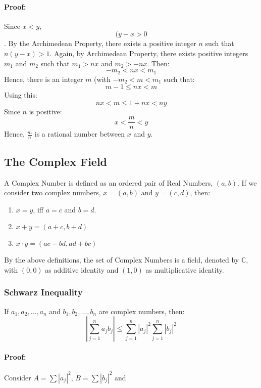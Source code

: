 \documentclass[12pt, oneside]{book}
\begin{document}
\paragraph{Proof:} Since \(x<y\), \[(y-x > 0\].
By the Archimedean Property, there exists a positive integer \(n\) such that \(n(y-x) > 1\).
Again, by Archimedean Property, there exists positive integers \(m_1\) and \(m_2\) such that \(m_1 > nx\) and \(m_2 > -nx\).
Then: \[ -m_2 < nx < m_1 \]
Hence, there is an integer \(m\) (with \( -m_2 < m < m_1 \) such that:
\[ m-1 \leq nx < m \]
Using this:
\[ nx < m \leq 1+nx <ny \]
Since \(n\) is positive:
\[ x < \frac{m}{n} < y \]
Hence, \(\frac{m}{n}\) is a rational number between \(x\) and \(y\).

\subsection{The Complex Field}
A Complex Number is defined as an ordered pair of Real Numbers, \((a,b)\).
If we consider two complex numbers, \(x=(a,b)\) and \(y=(c,d)\), then:
\begin{enumerate}
	\item \(x = y\), iff \(a=c\) and \(b=d\).
	\item \(x+y = (a+c,b+d)\)
	\item \(x \cdot y = (ac-bd,ad+bc)\)
\end{enumerate}
By the above definitions, the set of Complex Numbers is a field, denoted by \(\mathbb{C}\), with \((0,0)\) as additive identity and \((1,0)\) as multiplicative identity.

\subsubsection{Schwarz Inequality}
If \( a_1, a_2, \dots, a_n \) and \( b_1, b_2, \dots, b_n \) are complex numbers, then:
\[ \left| \sum_{j=1}^{n} a_j b_j \right| \leq \sum_{j=1}^{n} \left|a_j\right|^2 \sum_{j=1}^{n} \left|b_j\right|^2 \]

\paragraph{Proof:} Consider \(A = \sum |a_j|^2 \), \(B = \sum |b_j|^2\) and
\end{document}
